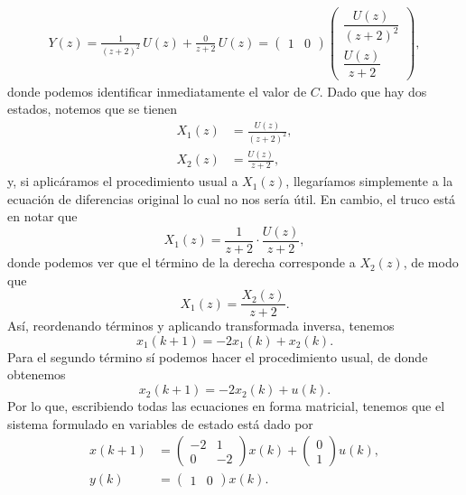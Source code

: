 \documentclass[
  11pt,
  letterpaper,
   addpoints,
  answers
  ]{exam}
\begin{document}
\begin{questions}
\begin{solution}
\begin{align}
Y(z) = \frac{1}{(z+2)^{2}}\,U(z)+\frac{0}{z+2}\,U(z) \nonumber = \begin{pmatrix}1 & 0\end{pmatrix}
        \begin{pmatrix}
        \dfrac{U(z)}{(z+2)^{2}}\\[6pt]
        \dfrac{U(z)}{z+2}
        \end{pmatrix},
\end{align}
donde podemos identificar inmediatamente el valor de $C$. Dado que hay dos estados, notemos que se tienen
\begin{align}
X_{1}(z) &= \frac{U(z)}{(z+2)^{2}},\\
X_{2}(z) &= \frac{U(z)}{z+2},
\end{align}
y, si aplicáramos el procedimiento usual a $X_{1}(z)$, llegaríamos simplemente a la ecuación de diferencias original lo cual no nos sería útil. En cambio, el truco está en notar que
\begin{equation}
X_{1}(z)=\frac{1}{z+2}\cdot\frac{U(z)}{z+2},
\end{equation}
donde podemos ver que el término de la derecha corresponde a $X_{2}(z)$, de modo que
\begin{equation}
X_{1}(z)=\frac{X_{2}(z)}{z+2}.
\end{equation}
Así, reordenando términos y aplicando transformada inversa, tenemos
\begin{equation}
x_{1}(k+1)=-2x_{1}(k)+x_{2}(k).
\end{equation}
Para el segundo término sí podemos hacer el procedimiento usual, de donde obtenemos
\begin{equation}
x_{2}(k+1)=-2x_{2}(k)+u(k).
\end{equation}
Por lo que, escribiendo todas las ecuaciones en forma matricial, tenemos que el sistema formulado en variables de estado está dado por
\begin{align}
x(k+1) &=
\begin{pmatrix}
-2 & 1\\
0  & -2
\end{pmatrix}x(k)+
\begin{pmatrix}
0\\ 1
\end{pmatrix}u(k),\\[4pt]
y(k) &= \begin{pmatrix}1 & 0\end{pmatrix}x(k).
\end{align}


\end{solution}
\end{questions}
\end{document}
